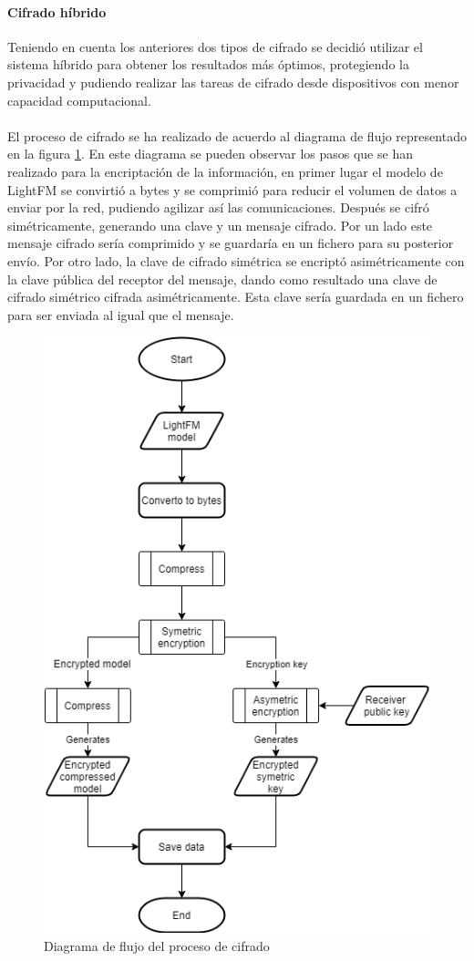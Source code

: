 \paragraph{Cifrado híbrido}
Teniendo en cuenta los anteriores dos tipos de cifrado se decidió utilizar el sistema híbrido para obtener los resultados más óptimos, protegiendo la privacidad y pudiendo realizar las tareas de cifrado desde dispositivos con menor capacidad computacional.
\\ \\ 
El proceso de cifrado se ha realizado de acuerdo al diagrama de flujo representado en la figura \ref{fig:Flow_Encryption}. En este diagrama se pueden observar los pasos que se han realizado para la encriptación de la información, en primer lugar el modelo de LightFM se convirtió a bytes y se comprimió para reducir el volumen de datos a enviar por la red, pudiendo agilizar así las comunicaciones. Después se cifró simétricamente, generando una clave y un mensaje cifrado. Por un lado este mensaje cifrado sería comprimido y se guardaría en un fichero para su posterior envío. Por otro lado, la clave de cifrado simétrica se encriptó asimétricamente con la clave pública del receptor del mensaje, dando como resultado una clave de cifrado simétrico cifrada asimétricamente. Esta clave sería guardada en un fichero para ser enviada al igual que el mensaje.
\begin{figure}[H]
    \centering
    \includegraphics[height=0.6\textheight]{Figuras/flowchart_encryption.png}    
    \caption{Diagrama de flujo del proceso de cifrado} 
    \label{fig:Flow_Encryption}
\end{figure}


